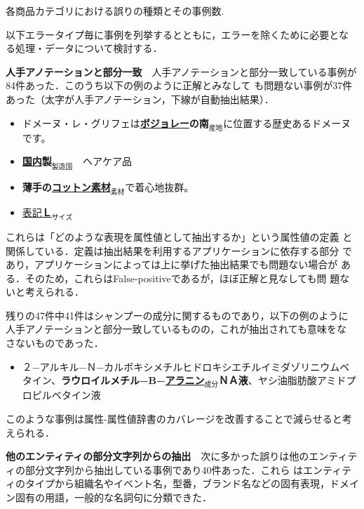 \documentclass[japanese]{jnlp_1.4}
\begin{document}
\begin{table}[b]
\caption{各商品カテゴリにおける誤りの種類とその事例数.}
\label{error_type_fp}

\end{table}

以下エラータイプ毎に事例を列挙するとともに，エラーを除くために必要とな
る処理・データについて検討する．

\vspace{1.5\Cvs}
\noindent
\textbf{人手アノテーションと部分一致}　人手アノテーションと部分一致している事例が84件あった．このうち以下の例のように正解とみなして
も問題ない事例が37件あった（太字が人手アノテーション，下線が自動抽出結果）．

\begin{itemize}
\item ドメーヌ・レ・グリフェは{\bf \underline{ボジョレー}の南}$_{産地}$に位置する歴史あるドメーヌです。
\item {\bf \underline{国内}製}$_{製造国}$　ヘアケア品
\item {\bf 薄手の\underline{コットン素材}}$_{素材}$で着心地抜群。
\item \underline{表記{\bf Ｌ}}$_{サイズ}$
\end{itemize}

\noindent これらは「どのような表現を属性値として抽出するか」という属性値の定義
と関係している．定義は抽出結果を利用するアプリケーションに依存する部分
であり，アプリケーションによっては上に挙げた抽出結果でも問題ない場合が
ある．そのため，これらはFalse-positiveであるが，ほぼ正解と見なしても問
題ないと考えられる．

残りの47件中41件はシャンプーの成分に関するものであり，以下の例のように
人手アノテーションと部分一致しているものの，これが抽出されても意味をな
さないものであった．

\begin{itemize}
\item ２−アルキル−Ｎ−カルボキシメチルヒドロキシエチルイミダゾリニウムベタイン、{\bf ラウロイルメチル−Β−\underline{アラニン}$_{成分}$ＮＡ液}、ヤシ油脂肪酸アミドプロピルベタイン液
\end{itemize}

\noindent
このような事例は属性-属性値辞書のカバレージを改善することで減らせると考えられる．

\vspace{1\Cvs}
\noindent
\textbf{他のエンティティの部分文字列からの抽出}　次に多かった誤りは他のエンティティの部分文字列から抽出している事例であり40件あった．これら
はエンティティのタイプから組織名やイベント名，型番，ブランド名などの固有表現，ドメイン固有の用語，一般的な名詞句に分類できた．
\end{document}

